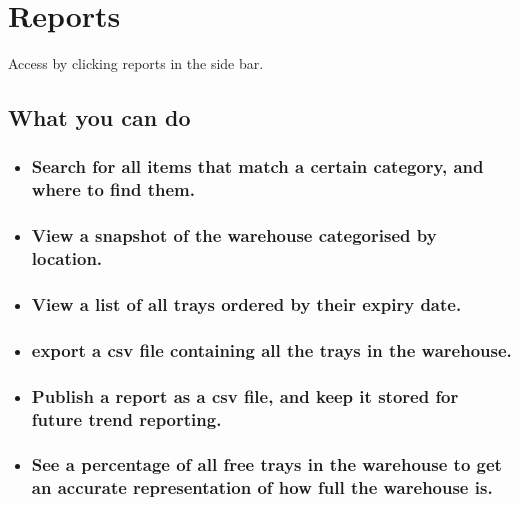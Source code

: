 \documentclass[letterpaper,10pt,english]{sphinxmanual}
\let\oldsubsection\subsection
\renewcommand{\subsection}{\needspace{6\baselineskip}\oldsubsection}
\begin{document}
\section{Reports}
\label{\detokenize{docs/ui/reports:reports}}\label{\detokenize{docs/ui/reports::doc}}
Access by clicking reports in the side bar.


\subsection{What you can do}
\label{\detokenize{docs/ui/reports:what-you-can-do}}\begin{itemize}
\item {} \subsubsection*{Search for all items that match a certain category, and
where to find them.}

\item {} \subsubsection*{View a snapshot of the warehouse categorised by location.}

\item {} \subsubsection*{View a list of all trays ordered by their expiry date.}

\item {} \subsubsection*{export a csv file containing all the trays in the
warehouse.}

\item {} \subsubsection*{Publish a report as a csv file, and keep it stored for
future trend reporting.}

\item {} \subsubsection*{See a percentage of all free trays in the warehouse to
get an accurate representation of how full the warehouse is.}

\end{itemize}
\end{document}
